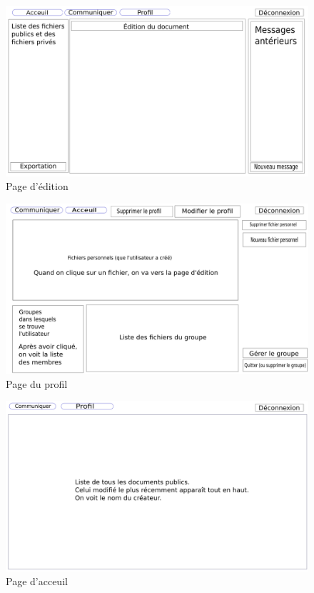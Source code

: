 \documentclass[a4paper, 12pt]{article}
\begin{document}
\begin{figure}[H]
  \begin{center}
    \includegraphics[scale=0.3]{edition.png}
  \end{center}
  \caption{Page d'édition}
\end{figure}

\begin{figure}[H]
  \begin{center}
    \includegraphics[scale=0.3]{profil.png}
  \end{center}
  \caption{Page du profil}
\end{figure}

\begin{figure}[H]
  \begin{center}
    \includegraphics[scale=0.3]{acceuil.png}
  \end{center}
  \caption{Page d'acceuil}
\end{figure}
\end{document}

